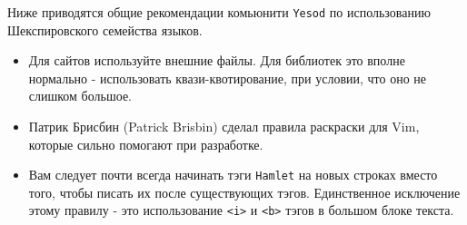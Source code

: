 Ниже приводятся общие рекомендации комьюнити \texttt{Yesod} по использованию
Шекспировского семейства языков.

\begin{itemize}
\item Для сайтов используйте внешние файлы. Для библиотек это вполне
нормально - использовать квази-квотирование, при условии, что оно не слишком большое.
\item Патрик Брисбин (Patrick Brisbin) сделал правила раскраски для Vim,
которые сильно помогают при разработке.
\item Вам следует почти всегда начинать тэги \texttt{Hamlet} на новых строках вместо того,
чтобы писать их после существующих тэгов. Единственное исключение этому правилу - это
использование \lstinline!<i>! и \lstinline!<b>! тэгов в большом блоке текста.
\end{itemize}
